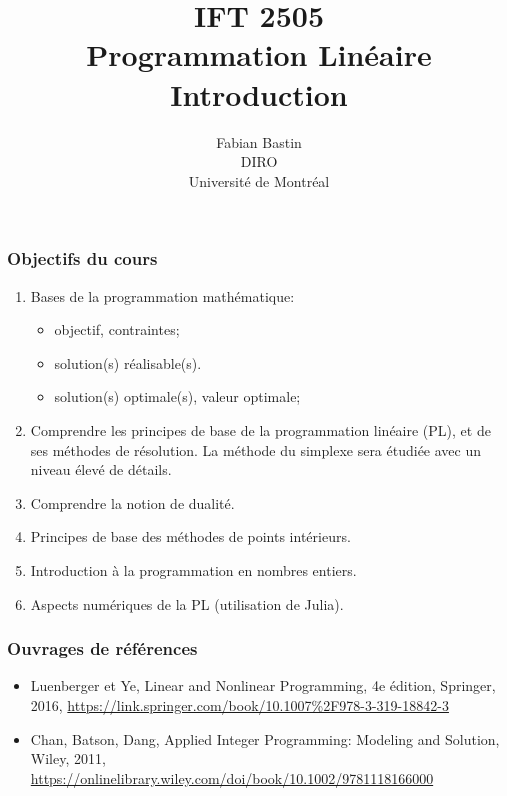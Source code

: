 \documentclass[usepdftitle=false]{beamer}
\title[IFT2505]{IFT 2505\\Programmation Linéaire\\Introduction}
\author[Fabian Bastin]{Fabian Bastin\\DIRO\\Université de Montréal}
\date{}
\begin{document}
\frame{\titlepage}

\begin{frame}
\frametitle{Objectifs du cours}

\begin{enumerate}
\item
Bases de la programmation mathématique:
\begin{itemize}
\item
objectif, contraintes;
\item
solution(s) réalisable(s).
\item
solution(s) optimale(s), valeur optimale;
\end{itemize}
\item
Comprendre les principes de base de la programmation linéaire (PL), et de ses méthodes de résolution. La méthode du simplexe sera étudiée avec un niveau élevé de détails.
\item
Comprendre la notion de dualité.
\item
Principes de base des méthodes de points intérieurs.
\item
Introduction à la programmation en nombres entiers.
\item
Aspects numériques de la PL (utilisation de Julia).
\end{enumerate}

\end{frame}

\begin{frame}
\frametitle{Ouvrages de références}

\begin{itemize}
	\item
	Luenberger et Ye, Linear and Nonlinear Programming, 4e édition, Springer, 2016, \url{https://link.springer.com/book/10.1007\%2F978-3-319-18842-3}
	\item
	Chan, Batson, Dang, Applied Integer Programming: Modeling and Solution, Wiley, 2011,
	\url{https://onlinelibrary.wiley.com/doi/book/10.1002/9781118166000}
\end{itemize}

\end{frame}
\end{document}
